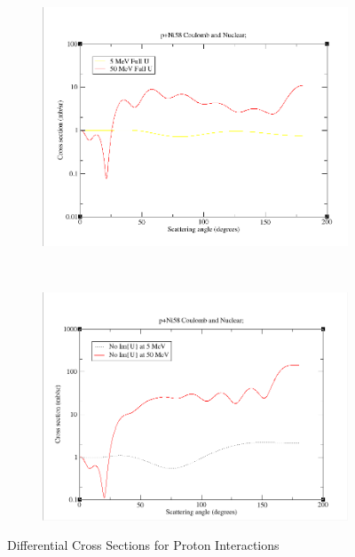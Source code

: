 \documentclass[paper=a4, fontsize=11pt]{scrartcl} %
\numberwithin{equation}{section} %
\numberwithin{figure}{section} %
\numberwithin{table}{section} %
\begin{document}
 \begin{figure}[hbt]
        \centering
        \begin{subfigure}[b!]{0.35\textwidth}
                \includegraphics[width=\textwidth]{FullUComp.PNG}
        \end{subfigure}%
        ~ %
\quad
        \begin{subfigure}[b!]{0.35\textwidth}
                \includegraphics[width=\textwidth]{NoImuComparison.PNG}
        \end{subfigure}

        \caption{Differential Cross Sections for Proton Interactions}
\end{figure}
\end{document}
